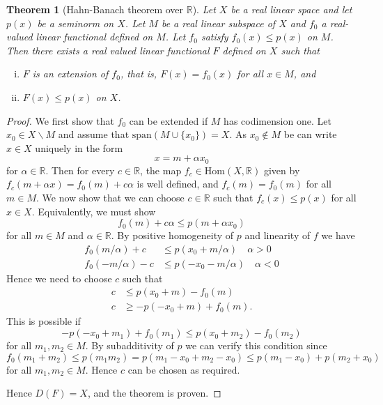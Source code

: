 \documentclass[justified]{tufte-book}
\theoremstyle{plain}%
\newtheorem{thm}{Theorem}[chapter]
\theoremstyle{definition}
\theoremstyle{remark}
\newcommand{\R}{\mathbb{R}}
\begin{document}
\begin{thm}[Hahn-Banach theorem over $\R$]
  Let $X$ be a real linear space and let $p(x)$ be a seminorm on $X$.  Let $M$ be a real linear subspace of $X$ and $f_0$ a real-valued linear functional defined on $M$.  Let $f_0$ satisfy $f_0(x) \leq p(x)$ on $M$.  Then there exists a real valued linear functional $F$ defined on $X$ such that 
  \begin{enumerate}[(i)]
      \item $F$ is an extension of $f_0$, that is, $F(x) = f_0(x)$ for all $x \in M$, and 
      \item $F(x) \leq p(x)$ on $X$.  
  \end{enumerate}
\end{thm}

\begin{proof}
  We first show that $f_0$ can be extended if $M$ has codimension one.  Let $x_0 \in X \backslash M$ and assume that $\text{span}(M \cup \{ x_0 \}) = X$. As $x_0 \notin M$ be can write $x \in X$ uniquely in the form \[
      x = m + \alpha x_0
  \] for $\alpha \in \R$.  Then for every $c \in \R$, the map $f_c \in \text{Hom}(X, \R)$ given by $f_c(m + \alpha x) = f_0(m) + c \alpha$ is well defined, and $f_c(m) = f_0(m)$ for all $m \in M$. We now show that we can choose $c \in \R$ such that $f_c(x) \leq p(x)$ for all $ x \in X$.  Equivalently, we must show 
  \[
      f_0(m) + c \alpha \leq p(m + \alpha x_0)
  \] for all $m \in M$ and $\alpha \in \R$.  By positive homogeneity of $p$ and linearity of $f$ we have \begin{align*}
      f_0(m / \alpha) + c &\leq p(x_0 + m/\alpha) \quad \alpha > 0 \\
      f_0(-m/\alpha) - c &\leq p(-x_0 -m/\alpha) \quad \alpha < 0
  \end{align*}  Hence we need to choose $c$ such that \begin{align*}
      c &\leq p(x_0 + m) - f_0(m) \\
      c &\geq -p(-x_0 + m) + f_0(m).
  \end{align*}  This is possible if \[
      -p(-x_0 + m_1) + f_0(m_1) \leq p(x_0 + m_2) - f_0(m_2) 
  \] for all $m_1, m_2 \in M$.  By subadditivity of $p$ we can verify this condition since \[
      f_0(m_1 + m_2) \leq p(m_1 m_2) = p(m_1 - x_0 + m_2 - x_0) \leq p(m_1 - x_0) + p(m_2 + x_0)
  \] for all $m_1, m_2 \in M$.  Hence $c$ can be chosen as required.
  
  
  Hence $D(F) = X$, and the theorem is proven.
\end{proof}
\end{document}
